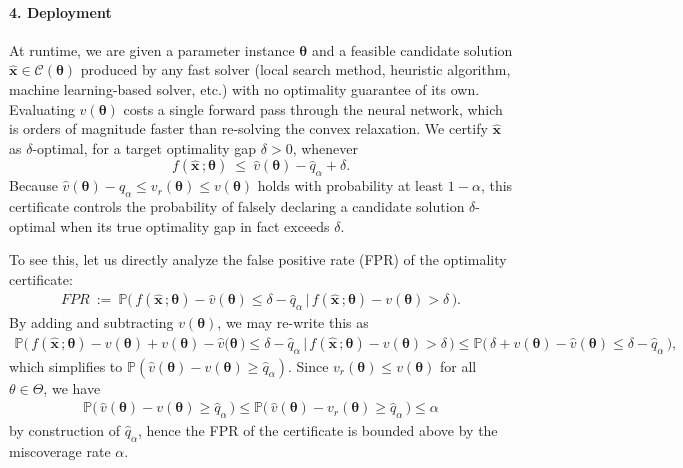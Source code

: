 \documentclass[10pt]{article} %
\theoremstyle{plain}
\theoremstyle{definition}
\theoremstyle{remark}
\begin{document}
\paragraph{4. Deployment} At runtime, we are given a parameter instance $\bm{\theta}$ and a feasible candidate solution $\hat{\mathbf{x}} \in \mathcal{C}(\bm{\theta})$ produced by any fast solver (local search method, heuristic algorithm, machine learning-based solver, etc.) with no optimality guarantee of its own. Evaluating $\hat{v}(\bm{\theta})$ costs a single forward pass through the neural network, which is orders of magnitude faster than re-solving the convex relaxation. We certify $\hat{\mathbf{x}}$ as $\delta$-optimal, for a target optimality gap $\delta > 0$, whenever
\begin{equation*}
    f(\hat{\mathbf{x}}\, ; \bm{\theta}) ~\leq~ \hat{v}(\bm{\theta}) - \hat{q}_\alpha + \delta.
\end{equation*}
Because $\hat{v}(\bm{\theta}) - \hat{q}_\alpha \leq v_r(\bm{\theta}) \leq v(\bm{\theta})$ holds with probability at least $1 - \alpha$, this certificate controls the probability of falsely declaring a candidate solution $\delta$-optimal when its true optimality gap in fact exceeds $\delta$.

To see this, let us directly analyze the false positive rate (FPR) of the optimality certificate:
\begin{align*}
    \mathit{FPR} ~:=~ \mathbb{P} \big( \, f(\hat{\mathbf{x}}\, ; \bm{\theta}) - \hat{v}(\bm{\theta}) \leq \delta - \hat{q}_\alpha \,|\, f(\hat{\mathbf{x}}\, ; \bm{\theta}) - v(\bm{\theta}) > \delta \, \big).
\end{align*}
By adding and subtracting $v(\bm{\theta})$, we may re-write this as
\begin{align*}
    \mathbb{P} \big( \, f(\hat{\mathbf{x}}\, ; \bm{\theta}) - v(\bm{\theta}) + v(\bm{\theta}) - \hat{v}(\bm{\theta} \, \big) \leq \delta - \hat{q}_\alpha \,|\, f(\hat{\mathbf{x}}\, ; \bm{\theta}) - v(\bm{\theta}) > \delta \, \big)
    \leq \mathbb{P} \big( \, \delta + v(\bm{\theta}) - \hat{v}(\bm{\theta}) \leq \delta - \hat{q}_\alpha \, \big),
\end{align*}
which simplifies to $\mathbb{P}(\hat{v}(\bm{\theta}) - v(\bm{\theta}) \geq \hat{q}_\alpha)$. Since $v_r(\bm{\theta}) \leq v(\bm{\theta})$ for all $\theta \in \Theta$, we have
\begin{align*}
    \mathbb{P}\big( \, \hat{v}(\bm{\theta}) - v(\bm{\theta}) \geq \hat{q}_\alpha \, \big ) \leq \mathbb{P} \big( \, \hat{v}(\bm{\theta}) - v_r(\bm{\theta}) \geq \hat{q}_\alpha \, \big) \leq \alpha
\end{align*}
by construction of $\hat{q}_\alpha$, hence the FPR of the certificate is bounded above by the miscoverage rate $\alpha$. 
\end{document}
